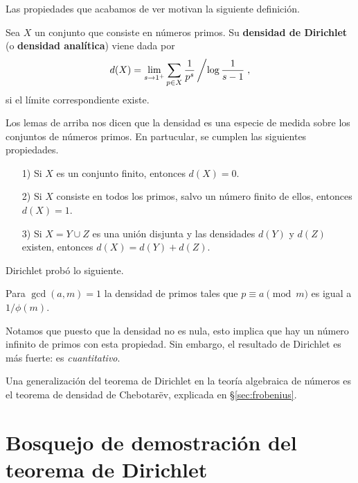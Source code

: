 \vspace{1em}

Las propiedades que acabamos de ver motivan la siguiente definición.

\begin{definicion}
  Sea $X$ un conjunto que consiste en números primos.
  Su \textbf{densidad de Dirichlet} (o \textbf{densidad analítica})
  viene dada por
  $$d (X) = \lim_{s \to 1^+} \sum_{p \in X} \frac{1}{p^s}\left/\log \frac{1}{s-1}\right.,$$
  si el límite correspondiente existe.
\end{definicion}

Los lemas de arriba nos dicen que la densidad es una especie de medida sobre los
conjuntos de números primos. En partucular, se cumplen las siguientes
propiedades.

\begin{enumerate}
\item[1)] Si $X$ es un conjunto finito, entonces $d (X) = 0$.

\item[2)] Si $X$ consiste en todos los primos, salvo un número finito de ellos,
  entonces $d (X) = 1$.

\item[3)] Si $X = Y \cup Z$ es una unión disjunta y las densidades $d (Y)$ y
  $d (Z)$ existen, entonces $d (X) = d (Y) + d (Z)$.
\end{enumerate}

Dirichlet probó lo siguiente.

\begin{teorema}
  Para $\gcd (a,m) = 1$ la densidad de primos tales que $p \equiv a \pmod{m}$
  es igual a $1/\phi(m)$.
\end{teorema}

Notamos que puesto que la densidad no es nula, esto implica que hay un número
infinito de primos con esta propiedad. Sin embargo, el resultado de Dirichlet
es más fuerte: es \emph{cuantitativo}.

Una generalización del teorema de Dirichlet en la teoría algebraica de números
es el teorema de densidad de Chebotarëv, explicada en \S\ref{sec:frobenius}.


\section{Bosquejo de demostración del teorema de Dirichlet}

